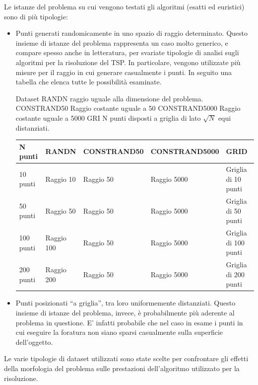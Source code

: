 	Le istanze del problema su cui vengono testati gli algoritmi (esatti ed euristici) sono di più tipologie: 
	\begin{itemize}
	\item	Punti generati randomicamente in uno spazio di raggio determinato. Questo insieme di istanze del problema rappresenta un caso molto generico, e compare spesso anche in letteratura, per svariate tipologie di analisi sugli algoritmi per la risoluzione del TSP. In particolare, vengono utilizzate più misure per il raggio in cui generare casualmente i punti. In seguito una tabella che elenca tutte le possibilità esaminate.

	
	\subitem    Dataset RANDN	raggio uguale alla dimensione del problema. 
	\subitem 	CONSTRAND50	Raggio costante uguale a 50	
	\subitem 	CONSTRAND5000 Raggio costante uguale a 5000
	\subitem 	GRI	N punti disposti a griglia di lato $\sqrt{N}$ equi distanziati. 
	\\
	\begin{center}


	\begin{tabular}{lllll}
		
		N punti	&  RANDN 
		 &	CONSTRAND50
	 &	CONSTRAND5000
			& GRID \\
		
   \hline 
	10 punti &	Raggio 10 &	Raggio 50&	Raggio 5000 &	Griglia di 10 punti\\

	50 punti &	Raggio 50&	Raggio 50&	Raggio 5000&	Griglia di 50 punti\\
 
	100 punti&	Raggio 100&	Raggio 50&	Raggio 5000&	Griglia di 100 punti\\

	200 punti &	Raggio 200&	Raggio 50&	Raggio 5000	&Griglia di 200 punti\\	
	\hline 
\end{tabular} 
	\end{center}

	\item Punti posizionati “a griglia”, tra loro uniformemente distanziati. Questo insieme di istanze del problema, invece, è probabilmente più aderente al problema in questione. E’ infatti probabile che nel caso in esame i punti in cui eseguire la foratura non siano sparsi casualmente sulla superficie dell’oggetto. 
	\end{itemize}
	
	Le varie tipologie di dataset utilizzati sono state scelte per confrontare gli effetti della morfologia del problema sulle prestazioni dell’algoritmo utilizzato per la risoluzione. 
